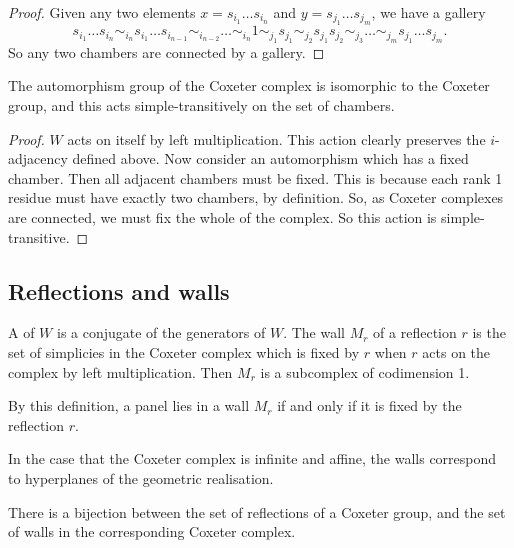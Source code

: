 \documentclass[11pt]{article}
\begin{document}
\begin{proof}
    Given any two elements $x=s_{i_1}\hdots s_{i_n}$ and $y=s_{j_1}\hdots s_{j_m}$, we have a gallery
    \[s_{i_1}\hdots s_{i_n}\sim_{i_n}s_{i_1}\hdots s_{i_{n-1}}\sim_{i_{n-2}}\hdots \sim_{i_n} 1 \sim_{j_1}s_{j_1}\sim_{j_2}s_{j_1}s_{j_2}\sim_{j_3}\hdots\sim_{j_m}s_{j_1}\hdots s_{j_m}.\]
    So any two chambers are connected by a gallery.
\end{proof}


\begin{lemma}
    The automorphism group of the Coxeter complex is isomorphic to the Coxeter group, and this acts simple-transitively on the set of chambers.
\end{lemma}

\begin{proof}
    $W$ acts on itself by left multiplication. This action clearly preserves the $i$-adjacency defined above. Now consider an automorphism which has a fixed chamber. Then all adjacent chambers must be fixed. This is because each rank 1 residue must have exactly two chambers, by definition. So, as Coxeter complexes are connected, we must fix the whole of the complex. So this action is simple-transitive. 
\end{proof}

\subsection{Reflections and walls}
\begin{definition}
    A  of $W$ is a conjugate of the generators of $W$. The wall $M_r$ of a reflection $r$ is the set of simplicies in the Coxeter complex which is fixed by $r$ when $r$ acts on the complex by left multiplication. Then $M_r$ is a subcomplex of codimension 1.
\end{definition}

By this definition, a panel lies in a wall $M_r$ if and only if it is fixed by the reflection $r$. 

\begin{example}
    In the case that the Coxeter complex is infinite and affine, the walls correspond to hyperplanes of the geometric realisation. 
\end{example}

\begin{theorem}
    There is a bijection between the set of reflections of a Coxeter group, and the set of walls in the corresponding Coxeter complex.
\end{theorem}
\end{document}
